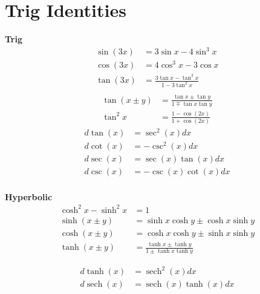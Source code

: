 \documentclass[twocolumn]{article}
\DeclareMathOperator{\sech}{sech}
\theoremstyle{definition}
\begin{document}
\section{Trig Identities}

\textbf{Trig}
\begin{align}
	\sin(3x) &= 3 \sin x - 4 \sin^3 x \\
	\cos(3x) &= 4 \cos^3 x - 3 \cos x \\ 
	\tan(3x) &= \frac{3 \tan x - \tan^3 x}{1 - 3 \tan^2 x} \\
\end{align}
\begin{align*}
\tan(x \pm y) &= \frac{\tan x \pm \tan y}{1 \mp \tan x \tan y}\\
\tan^2 x &= \frac{1 - \cos(2x)}{1 + \cos(2x)}
\end{align*}
\begin{align*}
	d \tan(x) &= \sec^2(x) dx\\
	d \cot(x) &= - \csc^2(x) dx\\
	d \sec(x) &= \sec(x)\tan(x) dx\\
	d \csc(x) &= - \csc(x)\cot(x) dx\\
\end{align*}

\textbf{Hyperbolic}
\begin{align*}
\cosh^2 x - \sinh^2 x &= 1 \\
\sinh(x \pm y) &= \sinh x \cosh y \pm \cosh x \sinh y \\
\cosh(x \pm y) &= \cosh x \cosh y \pm \sinh x \sinh y \\
\tanh(x \pm y) &= \frac{\tanh x \pm \tanh y}{1 \pm \tanh x \tanh y}
\end{align*}

\begin{align*}
	d \tanh(x) &= \sech^2(x) dx\\
	d \sech(x) &= \sech(x)\tanh(x) dx\\
\end{align*}
\end{document}

